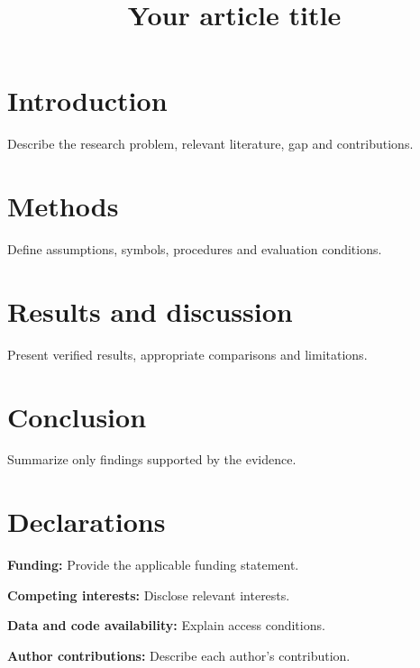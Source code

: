 \documentclass{jecde}
\title{Your article title}
\begin{document}
\maketitle
\section{Introduction}
Describe the research problem, relevant literature, gap and contributions.
\section{Methods}
Define assumptions, symbols, procedures and evaluation conditions.
\section{Results and discussion}
Present verified results, appropriate comparisons and limitations.
\section{Conclusion}
Summarize only findings supported by the evidence.
\section*{Declarations}
\textbf{Funding:} Provide the applicable funding statement.

\textbf{Competing interests:} Disclose relevant interests.

\textbf{Data and code availability:} Explain access conditions.

\textbf{Author contributions:} Describe each author's contribution.
\end{document}
